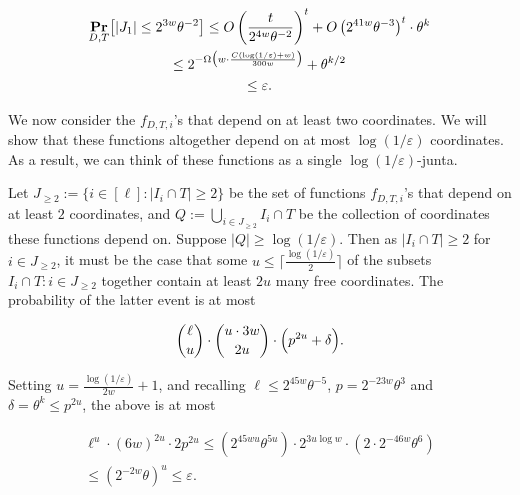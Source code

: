 \[\begin{gathered}
\displaystyle\mathop{\bf Pr\/}_{D,T}\bigl{[}\lvert J_{1}\rvert\leq 2^{3w}\theta^{-2}\bigr{]} \displaystyle\leq O\left(\frac{t}{2^{4w}\theta^{-2}}\right)^{t}+O\left(2^{41w}\theta^{-3}\right)^{t}\cdot\theta^{k} \\
\displaystyle\leq 2^{-\Omega\bigl{(}w\cdot\frac{C(\log(1/\varepsilon)+w)}{300w}\bigr{)}}+\theta^{k/2} \\
\displaystyle\leq\varepsilon.
\end{gathered}\]




We now consider the $f_{D,T,i}$’s that depend on at least two coordinates.
We will show that these functions altogether depend on at most $\log(1/\varepsilon)$ coordinates.
As a result, we can think of these functions as a single $\log(1/\varepsilon)$-junta.\par




Let $J_{\geq 2}:=\{i\in[\ell]:\lvert I_{i}\cap T\rvert\geq 2\}$ be the set of functions $f_{D,T,i}$’s that depend on at least $2$ coordinates, and $Q:=\bigcup_{i\in J_{\geq 2}}I_{i}\cap T$ be the collection of coordinates these functions depend on.
Suppose $\lvert Q\rvert\geq\log(1/\varepsilon)$.
Then as $\lvert I_{i}\cap T\rvert\geq 2$ for $i\in J_{\geq 2}$, it must be the case that some $u\leq\lceil\frac{\log(1/\varepsilon)}{2}\rceil$ of the subsets $I_{i}\cap T:i\in J_{\geq 2}$ together contain at least $2u$ many free coordinates.
The probability of the latter event is at most\par


\[\begin{gathered}
\binom{\ell}{u}\cdot\binom{u\cdot 3w}{2u}\cdot\Bigl{(}p^{2u}+\delta\Bigr{)}.
\end{gathered}\]


Setting $u=\frac{\log(1/\varepsilon)}{2w}+1$, and recalling $\ell\leq 2^{45w}\theta^{-5}$, $p=2^{-23w}\theta^{3}$ and $\delta=\theta^{k}\leq p^{2u}$, the above is at most\par


\[\begin{gathered}
\displaystyle\ell^{u}\cdot(6w)^{2u}\cdot 2p^{2u} \displaystyle\leq(2^{45wu}\theta^{5u})\cdot 2^{3u\log w}\cdot(2\cdot 2^{-46w}\theta^{6}) \\
\displaystyle\leq(2^{-2w}\theta)^{u}\leq\varepsilon.
\end{gathered}\]




